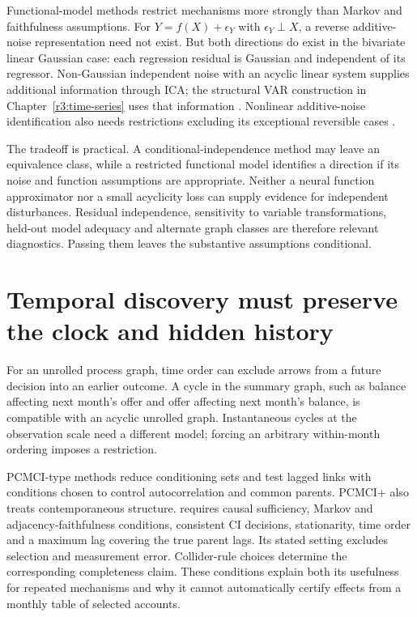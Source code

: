 Functional-model methods restrict mechanisms more strongly than Markov
and faithfulness assumptions. For $Y=f(X)+\epsilon_Y$ with
$\epsilon_Y\perp X$, a reverse additive-noise representation need
not exist. But both directions do exist in the bivariate linear
Gaussian case: each regression residual is Gaussian and independent
of its regressor. Non-Gaussian independent noise with an acyclic
linear system supplies additional information through ICA; the
structural VAR construction in Chapter~\ref{r3:time-series} uses
that information \citep[Sections 2.2--2.3]{hyvarinen2010}.
Nonlinear additive-noise identification also needs restrictions
excluding its exceptional reversible cases
\citep[Sections 7.1.2--7.1.5]{peters2017}.

The tradeoff is practical. A conditional-independence method may leave
an equivalence class, while a restricted functional model identifies
a direction if its noise and function assumptions are appropriate.
Neither a neural function approximator nor a small acyclicity loss
can supply evidence for independent disturbances. Residual independence,
sensitivity to variable transformations, held-out model adequacy and
alternate graph classes are therefore relevant diagnostics. Passing
them leaves the substantive assumptions conditional.

\section{Temporal discovery must preserve the clock and hidden history}
\label{r3:temporal-discovery}
For an unrolled process graph, time order can exclude arrows from a
future decision into an earlier outcome. A cycle in the summary graph,
such as balance affecting next month's offer and offer affecting next
month's balance, is compatible with an acyclic unrolled graph.
Instantaneous cycles at the observation scale need a different model;
forcing an arbitrary within-month ordering imposes a restriction.

PCMCI-type methods reduce conditioning sets and test lagged links with
conditions chosen to control autocorrelation and common parents.
PCMCI+ also treats contemporaneous structure.
\citet[Assumptions 1 and Theorems 1--2]{runge2020} requires causal
sufficiency, Markov and adjacency-faithfulness conditions, consistent
CI decisions, stationarity, time order and a maximum lag covering the
true parent lags. Its stated setting excludes selection and measurement
error. Collider-rule choices determine the corresponding completeness
claim. These conditions explain both its usefulness for repeated
mechanisms and why it cannot automatically certify effects from a
monthly table of selected accounts.

